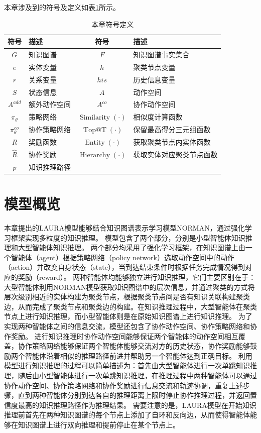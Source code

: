\documentclass[algorithmlist, AutoFakeBold, AutoFakeSlant, figurelist, tablelist, nomlist, engineering, openany]{seuthesix} %
\begin{document}
本章涉及到的符号及定义如表\ref{3_symbols}所示。
\begin{table}[ht]
  \centering
  \caption{本章符号定义}
  \begin{tabular*}{0.8\textwidth}{@{\extracolsep{\fill}}clcl}
		\toprule[1pt]
    符号 & 描述 & 符号 & 描述\\ \hline
    $G$ & 知识图谱 & $F$ & 知识图谱事实集合\\
    $e$ & 实体变量 & $h$ & 聚类节点变量\\
    $r$ & 关系变量 & $his$ & 历史信息变量\\
    $S$ & 状态信息 & $A$ & 动作空间\\
    $A^{add}$ & 额外动作空间 & $A^{co}$ & 协作动作空间\\
    $\pi_\theta$ & 策略网络 & $\operatorname{Similarity}(\cdot)$ & 相似度计算函数\\
    $\pi_\theta^{co}$ & 协作策略网络 & $\operatorname{Top@T}(\cdot)$ & 保留最高得分三元组函数\\
    $R$ & 奖励函数 & $\operatorname{Entity}(\cdot)$ & 获取聚类节点内实体函数\\
    $\hat{R}$ & 协作奖励 & $\operatorname{Hierarchy}(\cdot)$ & 获取实体对应聚类节点函数\\
    $p$ & 知识推理路径 & &\\
		\bottomrule[1pt]
	\end{tabular*}
  \label{3_symbols}
\end{table}

\section{模型概览}
本章提出的LAURA模型能够结合知识图谱表示学习模型NORMAN，通过强化学习框架实现多粒度的知识推理。
模型包含了两个部分，分别是小型智能体知识推理和大型智能体知识推理。
两个部分均采用了强化学习框架，在知识图谱上由一个智能体（agent）根据策略网络（policy network）选取动作空间中的动作（action）并改变自身状态（state），当到达结束条件时根据任务完成情况得到对应的奖励（reward）。
两种智能体均能够独立进行知识推理，它们主要区别在于：大型智能体利用NORMAN模型获取知识图谱中的层次信息，并通过聚类的方式将层次级别相近的实体构建为聚类节点，根据聚类节点间是否有知识关联构建聚类边，从而完成了聚类节点和聚类边的构建。在知识推理过程中，大型智能体在聚类节点上进行知识推理，而小型智能体则是在原始知识图谱上进行知识推理。
为了实现两种智能体之间的信息交流，模型还包含了协作动作空间、协作策略网络和协作奖励。
进行知识推理时协作动作空间能够保证两个智能体的动作空间相互覆盖，协作策略网络能够保证两个智能体能够交流对方的历史状态，协作奖励能够鼓励两个智能体沿着相似的推理路径前进并帮助另一个智能体达到正确目标。
利用模型进行知识推理的过程可以简单描述为：首先由大型智能体进行一次单跳知识推理，随后由小型智能体进行一次单跳知识推理，在推理过程中两种智能体可以通过协作动作空间、协作策略网络和协作奖励进行信息交流和轨迹协调，重复上述步骤，直到两种智能体分别到达各自的推理距离上限时停止协作推理过程，并返回置信度最高的知识推理路径作为推理结果。
需要注意的是，LAURA模型在开始知识推理前首先在两种知识图谱的每个节点上添加了自环和反向边，从而使得智能体能够在知识图谱上进行双向推理和提前停止在某个节点上。
\end{document}
